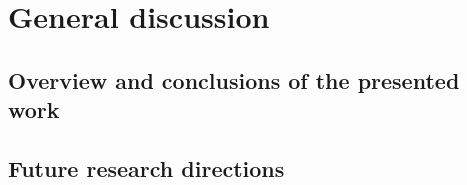 \newpage{\thispagestyle{empty}\cleardoublepage}
\chapter{General discussion} 
\label{chap:discussion}

\blindtext

\section{Overview and conclusions of the presented work}

\section{Future research directions}